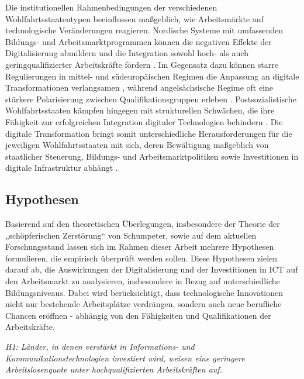 Die institutionellen Rahmenbedingungen der verschiedenen Wohlfahrtsstaatentypen beeinflussen 
maßgeblich, wie Arbeitsmärkte auf technologische Veränderungen reagieren. Nordische Systeme 
mit umfassenden Bildungs- und Arbeitsmarktprogrammen können die negativen Effekte der 
Digitalisierung abmildern und die Integration sowohl hoch- als auch geringqualifizierter 
Arbeitskräfte fördern \parencite[S. 27–30]{espingandersen1990thethree}. Im Gegensatz dazu 
können starre Regulierungen in mittel- und südeuropäischen Regimen die Anpassung an 
digitale Transformationen verlangsamen \parencite[S. 155]{ferrera1996thesouthern}, während 
angelsächsische Regime oft eine stärkere Polarisierung zwischen Qualifikationsgruppen 
erleben \parencite[S. 3–5]{hall2001varieties}. Postsozialistische Wohlfahrtsstaaten 
kämpfen hingegen mit strukturellen Schwächen, die ihre Fähigkeit zur erfolgreichen 
Integration digitaler Technologien behindern \parencite[S. 88–93]{cerami2006socialpolicy}. 
Die digitale Transformation bringt somit unterschiedliche Herausforderungen für die 
jeweiligen Wohlfahrtsstaaten mit sich, deren Bewältigung maßgeblich von staatlicher 
Steuerung, Bildungs- und Arbeitsmarktpolitiken sowie Investitionen in digitale 
Infrastruktur abhängt \parencite[S. 23]{oecd2020digital}.


\subsection{Hypothesen}

Basierend auf den theoretischen Überlegungen, insbesondere der Theorie der „schöpferischen 
Zerstörung“ von Schumpeter, sowie auf dem aktuellen Forschungsstand lassen sich im Rahmen 
dieser Arbeit mehrere Hypothesen formulieren, die empirisch überprüft werden sollen. Diese 
Hypothesen zielen darauf ab, die Auswirkungen der Digitalisierung und der Investitionen in 
\ac{ICT} auf den Arbeitsmarkt zu analysieren, insbesondere in Bezug auf unterschiedliche 
Bildungsniveaus. Dabei wird berücksichtigt, dass technologische Innovationen nicht nur 
bestehende Arbeitsplätze verdrängen, sondern auch neue berufliche Chancen eröffnen - 
abhängig von den Fähigkeiten und Qualifikationen der Arbeitskräfte.

\textit{H1: Länder, in denen verstärkt in Informations- und Kommunikationstechnologien 
investiert wird, weisen eine geringere Arbeitslosenquote unter hochqualifizierten 
Arbeitskräften auf.}

